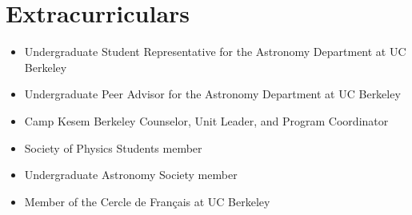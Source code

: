 \documentclass[letterpaper,10pt]{article}
\newcommand{\resumeSubHeadingListStart}{\begin{itemize}[leftmargin=*]}
\newcommand{\resumeSubHeadingListEnd}{\end{itemize}}
\newcommand{\shorterSection}[1]{\vspace{-10pt}\section{#1}}
\begin{document}
\shorterSection{Extracurriculars}
  \resumeSubHeadingListStart
  \small
    \item{Undergraduate Student Representative for the Astronomy Department at UC Berkeley}
    \vspace{-3pt}
    \item{Undergraduate Peer Advisor for the Astronomy Department at UC Berkeley}
    \vspace{-3pt}
    \item{Camp Kesem Berkeley Counselor, Unit Leader, and Program Coordinator}
    \vspace{-3pt}
    \item{Society of Physics Students member}
    \vspace{-3pt}
    \item{Undergraduate Astronomy Society member}
    \vspace{-3pt}
    \item{Member of the Cercle de Français at UC Berkeley}
  \resumeSubHeadingListEnd
  
\end{document}
